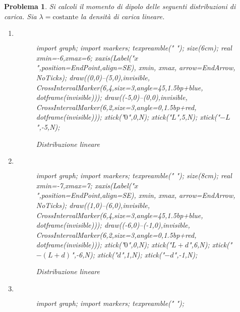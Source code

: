 \documentclass[a4paper,oneside]{article}
\newtheorem{problema}{Problema}
\let\oldhat\hat
\renewcommand{\vec}[1]{\mathbf{#1}}
\renewcommand{\hat}[1]{\widehat{\mathbf{#1}}}
\begin{document}
\begin{problema}
	Si calcoli il momento di dipolo delle seguenti distribuzioni di carica. 
	Sia $\lambda = \mathrm{costante}$ la densità di carica lineare.
	\begin{enumerate}
		\item $\,$
		\begin{figure}[H]
			\centering
			\begin{asy}
				import graph;
				import markers;
				texpreamble("\let\oldhat\hat
				\renewcommand{\vec}[1]{\mathbf{#1}}
				\renewcommand{\hat}[1]{\oldhat{\mathbf{#1}}}");
				size(6cm);
				real xmin=-6,xmax=6;
				xaxis(Label("\small $x$",position=EndPoint,align=SE),
				xmin, xmax, arrow=EndArrow, NoTicks);
				draw((0,0)--(5,0),invisible,
				CrossIntervalMarker(6,4,size=3,angle=45,1.5bp+blue,
				dotframe(invisible)));
				draw((-5,0)--(0,0),invisible,
				CrossIntervalMarker(6,2,size=3,angle=0,1.5bp+red,
				dotframe(invisible)));
				xtick("\small $0$",0,N);
				xtick("\small $L$",5,N);
				xtick("\small $-L$",-5,N);
			\end{asy}
			\caption{Distribuzione lineare}
			\label{fig:distribuzione_01}
		\end{figure}
		\item $\,$
		\begin{figure}[H]
			\centering
			\begin{asy}
				import graph;
				import markers;
				texpreamble("\let\oldhat\hat
				\renewcommand{\vec}[1]{\mathbf{#1}}
				\renewcommand{\hat}[1]{\oldhat{\mathbf{#1}}}");
				size(8cm);
				real xmin=-7,xmax=7;
				xaxis(Label("\small $x$",position=EndPoint,align=SE),
				xmin, xmax, arrow=EndArrow, NoTicks);
				draw((1,0)--(6,0),invisible,
				CrossIntervalMarker(6,4,size=3,angle=45,1.5bp+blue,
				dotframe(invisible)));
				draw((-6,0)--(-1,0),invisible,
				CrossIntervalMarker(6,2,size=3,angle=0,1.5bp+red,
				dotframe(invisible)));
				xtick("\small $0$",0,N);
				xtick("\small $L+d$",6,N);
				xtick("\small $-(L+d)$",-6,N);
				xtick("\small $d$",1,N);
				xtick("\small $-d$",-1,N);
			\end{asy}
			\caption{Distribuzione lineare}
			\label{fig:distribuzione_02}
		\end{figure}
		\item $\,$
		\begin{figure}[H]
			\centering
			\begin{asy}
				import graph;
				import markers;
				texpreamble("\let\oldhat\hat
				\renewcommand{\vec}[1]{\mathbf{#1}}
				\renewcommand{\hat}[1]{\oldhat{\mathbf{#1}}}");

\end{asy}
\end{figure}
\end{enumerate}
\end{problema}
\end{document}
